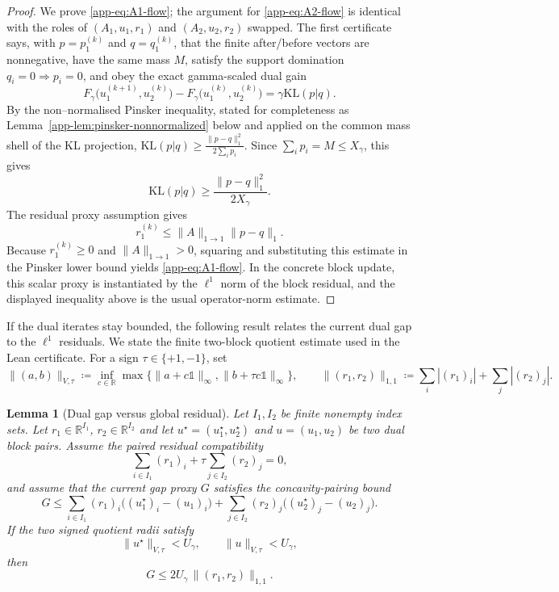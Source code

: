 \documentclass{article}
\theoremstyle{plain}
\newtheorem{lemma}{Lemma}[section]
\newcommand{\ones}{\mathds{1}}
\newcommand{\RR}{\mathbb{R}}
\newcommand{\Umax}{U_\gamma}
\newcommand{\Xmax}{X_\gamma}
\newcommand{\KLdiv}[2]{\mathrm{KL}(#1|#2)}
\begin{document}
\begin{proof}
We prove \eqref{app-eq:A1-flow}; the argument for \eqref{app-eq:A2-flow} is identical with the roles of $(A_{1},u_{1},r_{1})$ and $(A_{2},u_{2},r_{2})$ swapped.
%
The first certificate says, with $p=p_1^{(k)}$ and $q=q_1^{(k)}$, that the finite after/before
vectors are nonnegative, have the same mass $M$, satisfy the support domination $q_i=0\Rightarrow
p_i=0$, and obey the exact gamma-scaled dual gain
\[
  F_{\gamma}\bigl(u_{1}^{(k+1)},u_{2}^{(k)}\bigr)
  -F_{\gamma}\bigl(u_{1}^{(k)},u_{2}^{(k)}\bigr)
  = 
  \gamma \KLdiv{p}{q}.
\]
By the non--normalised Pinsker inequality, stated for completeness as
Lemma~\ref{app-lem:pinsker-nonnormalized} below and applied on the common mass shell of the
KL projection,
$
  \KLdiv{p}{q} \ge  \frac{\|p-q\|_{1}^{2}}{2 \sum_{i} p_{i}}.
$
Since $\sum_i p_i=M\le\Xmax{}$, this gives
\[
  \KLdiv{p}{q}
   \ge  \frac{\|p-q\|_{1}^{2}}{2 \Xmax}.
\]
The residual proxy assumption gives
\[
  r_1^{(k)}
   \le  \|A\|_{1\to1}\|p-q\|_1.
\]
Because $r_1^{(k)}\ge0$ and $\|A\|_{1\to1}>0$, squaring and substituting this estimate in the
Pinsker lower bound yields \eqref{app-eq:A1-flow}.  In the concrete block update, this scalar proxy
is instantiated by the $\ell^1$ norm of the block residual, and the displayed inequality above is
the usual operator-norm estimate.
\end{proof}


If the dual iterates stay bounded, the following result relates the current dual gap to the $\ell^{1}$ residuals.  We state the finite two-block quotient estimate used in the Lean certificate.  For a sign $\tau\in\{+1,-1\}$, set
\[
  \|(a,b)\|_{V,\tau}
  \coloneqq
  \inf_{c\in\RR}
  \max\bigl\{\|a+c\ones\|_\infty,\|b+\tau c\ones\|_\infty\bigr\},
  \qquad
  \|(r_1,r_2)\|_{1,1}\coloneqq \sum_i |(r_1)_i|+\sum_j |(r_2)_j|.
\]

\begin{lemma}[Dual gap versus global residual]
\label{app-lem:gap-vs-res-quotient}
Let $I_1,I_2$ be finite nonempty index sets.  Let
$r_1\in\RR^{I_1}$, $r_2\in\RR^{I_2}$ and let
$u^\star=(u_1^\star,u_2^\star)$ and $u=(u_1,u_2)$ be two dual block pairs.  Assume the paired residual compatibility
\[
  \sum_{i\in I_1}(r_1)_i+\tau\sum_{j\in I_2}(r_2)_j=0,
\]
and assume that the current gap proxy $G$ satisfies the concavity-pairing bound
\[
  G
  \le
  \sum_{i\in I_1}(r_1)_i\bigl((u_1^\star)_i-(u_1)_i\bigr)
  +\sum_{j\in I_2}(r_2)_j\bigl((u_2^\star)_j-(u_2)_j\bigr).
\]
If the two signed quotient radii satisfy
\[
  \|u^\star\|_{V,\tau}<\Umax,
  \qquad
  \|u\|_{V,\tau}<\Umax,
\]
then
\[
  G \le 2\Umax\,\|(r_1,r_2)\|_{1,1}.
\]
\end{lemma}
\end{document}
